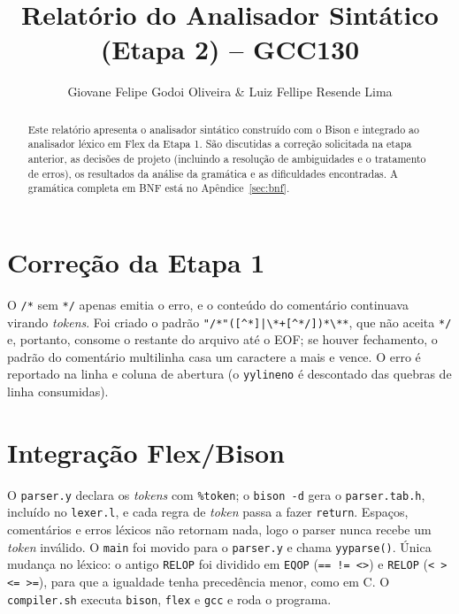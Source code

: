 \documentclass[sigconf,nonacm]{acmart}
\begin{document}
\title{Relatório do Analisador Sintático (Etapa 2) -- GCC130}

\author{Giovane Felipe Godoi Oliveira \& Luiz Fellipe Resende Lima}

\begin{abstract}
Este relatório apresenta o analisador sintático construído com o Bison e integrado ao
analisador léxico em Flex da Etapa 1. São discutidas a correção solicitada na etapa
anterior, as decisões de projeto (incluindo a resolução de ambiguidades e o tratamento
de erros), os resultados da análise da gramática e as dificuldades encontradas. A
gramática completa em BNF está no Apêndice~\ref{sec:bnf}.
\end{abstract}

\maketitle

\section{Correção da Etapa 1}
O \texttt{/*} sem \texttt{*/} apenas emitia o erro, e o conteúdo do comentário
continuava virando \emph{tokens}. Foi criado o padrão
\verb!"/*"([^*]|\*+[^*/])*\**!, que não aceita \texttt{*/} e, portanto, consome
o restante do arquivo até o EOF; se houver fechamento, o padrão do comentário
multilinha casa um caractere a mais e vence. O erro é reportado na linha e coluna de
abertura (o \texttt{yylineno} é descontado das quebras de linha consumidas).

\section{Integração Flex/Bison}
O \texttt{parser.y} declara os \emph{tokens} com \texttt{\%token}; o \texttt{bison -d}
gera o \texttt{parser.tab.h}, incluído no \texttt{lexer.l}, e cada regra de \emph{token}
passa a fazer \texttt{return}. Espaços, comentários e erros léxicos não retornam nada,
logo o parser nunca recebe um \emph{token} inválido. O \texttt{main} foi movido para o
\texttt{parser.y} e chama \texttt{yyparse()}. Única mudança no léxico: o antigo
\texttt{RELOP} foi dividido em \texttt{EQOP} (\texttt{== != <>}) e \texttt{RELOP}
(\texttt{< > <= >=}), para que a igualdade tenha precedência menor, como em C. O
\texttt{compiler.sh} executa \texttt{bison}, \texttt{flex} e \texttt{gcc} e roda o programa.
\end{document}
